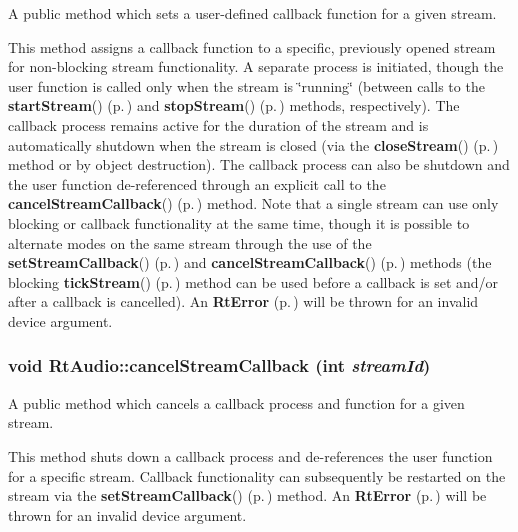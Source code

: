 A public method which sets a user-defined callback function for a given stream.

This method assigns a callback function to a specific, previously opened stream for non-blocking stream functionality. A separate process is initiated, though the user function is called only when the stream is \char`\"{}running\char`\"{} (between calls to the {\bf start\-Stream}() {\rm (p.\,\pageref{classRtAudio_a11})} and {\bf stop\-Stream}() {\rm (p.\,\pageref{classRtAudio_a12})} methods, respectively). The callback process remains active for the duration of the stream and is automatically shutdown when the stream is closed (via the {\bf close\-Stream}() {\rm (p.\,\pageref{classRtAudio_a10})} method or by object destruction). The callback process can also be shutdown and the user function de-referenced through an explicit call to the {\bf cancel\-Stream\-Callback}() {\rm (p.\,\pageref{classRtAudio_a5})} method. Note that a single stream can use only blocking or callback functionality at the same time, though it is possible to alternate modes on the same stream through the use of the {\bf set\-Stream\-Callback}() {\rm (p.\,\pageref{classRtAudio_a4})} and {\bf cancel\-Stream\-Callback}() {\rm (p.\,\pageref{classRtAudio_a5})} methods (the blocking {\bf tick\-Stream}() {\rm (p.\,\pageref{classRtAudio_a9})} method can be used before a callback is set and/or after a callback is cancelled). An {\bf Rt\-Error} {\rm (p.\,\pageref{classRtError})} will be thrown for an invalid device argument. 
\subsubsection{\setlength{\rightskip}{0pt plus 5cm}void Rt\-Audio::cancel\-Stream\-Callback (int {\em stream\-Id})}\label{classRtAudio_a5}


A public method which cancels a callback process and function for a given stream.

This method shuts down a callback process and de-references the user function for a specific stream. Callback functionality can subsequently be restarted on the stream via the {\bf set\-Stream\-Callback}() {\rm (p.\,\pageref{classRtAudio_a4})} method. An {\bf Rt\-Error} {\rm (p.\,\pageref{classRtError})} will be thrown for an invalid device argument. 

